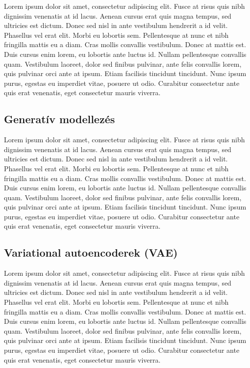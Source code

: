 \documentclass[12pt]{article}
\begin{document}
Lorem ipsum dolor sit amet, consectetur adipiscing elit. Fusce at risus quis nibh dignissim venenatis at id lacus. Aenean cursus erat quis magna tempus, sed ultricies est dictum. Donec sed nisl in ante vestibulum hendrerit a id velit. Phasellus vel erat elit. Morbi eu lobortis sem. Pellentesque at nunc et nibh fringilla mattis eu a diam. Cras mollis convallis vestibulum. Donec at mattis est. Duis cursus enim lorem, eu lobortis ante luctus id. Nullam pellentesque convallis quam. Vestibulum laoreet, dolor sed finibus pulvinar, ante felis convallis lorem, quis pulvinar orci ante at ipsum. Etiam facilisis tincidunt tincidunt. Nunc ipsum purus, egestas eu imperdiet vitae, posuere ut odio. Curabitur consectetur ante quis erat venenatis, eget consectetur mauris viverra.

\subsection{Generatív modellezés}

Lorem ipsum dolor sit amet, consectetur adipiscing elit. Fusce at risus quis nibh dignissim venenatis at id lacus. Aenean cursus erat quis magna tempus, sed ultricies est dictum. Donec sed nisl in ante vestibulum hendrerit a id velit. Phasellus vel erat elit. Morbi eu lobortis sem. Pellentesque at nunc et nibh fringilla mattis eu a diam. Cras mollis convallis vestibulum. Donec at mattis est. Duis cursus enim lorem, eu lobortis ante luctus id. Nullam pellentesque convallis quam. Vestibulum laoreet, dolor sed finibus pulvinar, ante felis convallis lorem, quis pulvinar orci ante at ipsum. Etiam facilisis tincidunt tincidunt. Nunc ipsum purus, egestas eu imperdiet vitae, posuere ut odio. Curabitur consectetur ante quis erat venenatis, eget consectetur mauris viverra.

\subsection{Variational autoencoderek (VAE)}

Lorem ipsum dolor sit amet, consectetur adipiscing elit. Fusce at risus quis nibh dignissim venenatis at id lacus. Aenean cursus erat quis magna tempus, sed ultricies est dictum. Donec sed nisl in ante vestibulum hendrerit a id velit. Phasellus vel erat elit. Morbi eu lobortis sem. Pellentesque at nunc et nibh fringilla mattis eu a diam. Cras mollis convallis vestibulum. Donec at mattis est. Duis cursus enim lorem, eu lobortis ante luctus id. Nullam pellentesque convallis quam. Vestibulum laoreet, dolor sed finibus pulvinar, ante felis convallis lorem, quis pulvinar orci ante at ipsum. Etiam facilisis tincidunt tincidunt. Nunc ipsum purus, egestas eu imperdiet vitae, posuere ut odio. Curabitur consectetur ante quis erat venenatis, eget consectetur mauris viverra.
\end{document}
